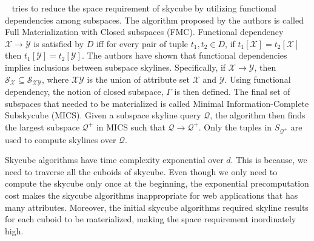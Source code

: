 ~\cite{maabout2016skycube} tries to reduce the space requirement of skycube by utilizing functional dependencies among subspaces. The algorithm proposed by the authors is called Full Materialization with Closed subspaces (FMC). Functional dependency $\mathcal{X} \rightarrow \mathcal{Y}$ is satisfied by $D$ iff for every pair of tuple $t_1, t_2 \in D$, if $t_1[\mathcal{X}] = t_2[\mathcal{X}]$ then $t_1[\mathcal{Y}] = t_2[\mathcal{Y}]$. The authors have shown that functional dependencies implies inclusions between subspace skylines. Specifically, if $\mathcal{X} \rightarrow \mathcal{Y}$, then $\mathcal{S}_\mathcal{X} \subseteq \mathcal{S}_{\mathcal{XY}}$, where $\mathcal{XY}$ is the union of attribute set $\mathcal{X}$ and $\mathcal{Y}$. 
Using functional dependency, the notion of closed subspace, $\Gamma$ is then defined. %
The final set of subspaces that needed to be materialized is called Minimal Information-Complete Subskycube (MICS). Given a subspace skyline query $\mathcal{Q}$, the algorithm then finds the largest subspace $\mathcal{Q^+}$ in MICS such that $\mathcal{Q} \rightarrow \mathcal{Q}^+$. Only the tuples in $S_{\mathcal{Q}^+}$ are used to compute skylines over $\mathcal{Q}$.

\vspace{1mm}
 Skycube algorithms have time complexity exponential over $d$. This is because, we need to traverse all the cuboids of skycube. Even though we only need to compute the skycube only once at the beginning, the exponential precomputation cost makes the skycube algorithms inappropriate for web applications that has many attributes. Moreover, the initial skycube algorithms required skyline results for each cuboid to be materialized, making the space requirement inordinately high.

